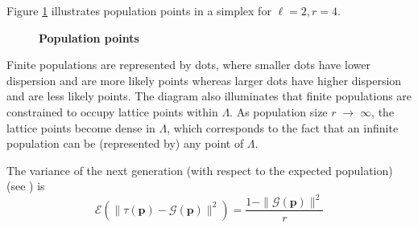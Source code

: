 Figure \ref{tetra_popn} illustrates population points in a simplex for $\ell  =  2,  r  =  4$. 
\begin{figure}[h]
\begin{center}
\hspace{4pt}
\caption{\textbf{Population points} }
\label{tetra_popn}
\end{center}
\end{figure}
Finite populations are represented by dots, 
where smaller dots have lower dispersion and are more likely points whereas larger dots have higher dispersion and are less likely points. 
The diagram also illuminates that finite populations are constrained to occupy lattice points 
within $\Lambda$. As population size $r \;\to\; \infty$, the lattice points become dense in $\Lambda$, 
which corresponds to the fact that an infinite population can be (represented by) any point of $\Lambda$.  

The variance of the next generation (with respect to the expected population) (see \cite{Vose1999}) is 
\begin{equation}
\label{RHSvariance}
\mathcal{E}(\| \tau (\bm{p}) - \mathcal{G}(\bm{p}) \|^2) = \frac{1 - \|\mathcal{G}(\bm{p})\|^2}{r}
\end{equation}

